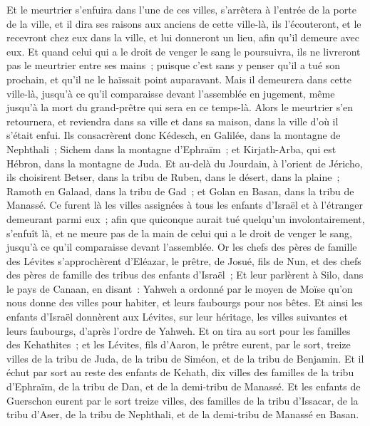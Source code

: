 \begin{multicols}{2}
Et le meurtrier s'enfuira dans l'une de ces villes, s'arrêtera à l'entrée de la porte de la ville, et il dira ses raisons aux anciens de cette ville-là, ils l'écouteront, et le recevront chez eux dans la ville, et lui donneront un lieu, afin qu'il demeure avec eux.
Et quand celui qui a le droit de venger le sang le poursuivra, ils ne livreront pas le meurtrier entre ses mains~; puisque c'est sans y penser qu'il a tué son prochain, et qu'il ne le haïssait point auparavant.
Mais il demeurera dans cette ville-là, jusqu'à ce qu'il comparaisse devant l'assemblée en jugement, même jusqu'à la mort du grand-prêtre qui sera en ce temps-là. Alors le meurtrier s'en retournera, et reviendra dans sa ville et dans sa maison, dans la ville d'où il s'était enfui.
Ils consacrèrent donc Kédesch, en Galilée, dans la montagne de Nephthali~; Sichem dans la montagne d'Ephraïm~; et Kirjath-Arba, qui est Hébron, dans la montagne de Juda.
Et au-delà du Jourdain, à l'orient de Jéricho, ils choisirent Betser, dans la tribu de Ruben, dans le désert, dans la plaine~; Ramoth en Galaad, dans la tribu de Gad~; et Golan en Basan, dans la tribu de Manassé.
Ce furent là les villes assignées à tous les enfants d'Israël et à l'étranger demeurant parmi eux~; afin que quiconque aurait tué quelqu'un involontairement, s'enfuît là, et ne meure pas de la main de celui qui a le droit de venger le sang, jusqu'à ce qu'il comparaisse devant l'assemblée.
\VerseOne{}Or les chefs des pères de famille des Lévites s'approchèrent d'Eléazar, le prêtre, de Josué, fils de Nun, et des chefs des pères de famille des tribus des enfants d'Israël~;
Et leur parlèrent à Silo, dans le pays de Canaan, en disant~: Yahweh a ordonné par le moyen de Moïse qu'on nous donne des villes pour habiter, et leurs faubourgs pour nos bêtes.
Et ainsi les enfants d'Israël donnèrent aux Lévites, sur leur héritage, les villes suivantes et leurs faubourgs, d'après l'ordre de Yahweh.
Et on tira au sort pour les familles des Kehathites~; et les Lévites, fils d'Aaron, le prêtre eurent, par le sort, treize villes de la tribu de Juda, de la tribu de Siméon, et de la tribu de Benjamin.
Et il échut par sort au reste des enfants de Kehath, dix villes des familles de la tribu d'Ephraïm, de la tribu de Dan, et de la demi-tribu de Manassé.
Et les enfants de Guerschon eurent par le sort treize villes, des familles de la tribu d'Issacar, de la tribu d'Aser, de la tribu de Nephthali, et de la demi-tribu de Manassé en Basan.

\end{multicols}
